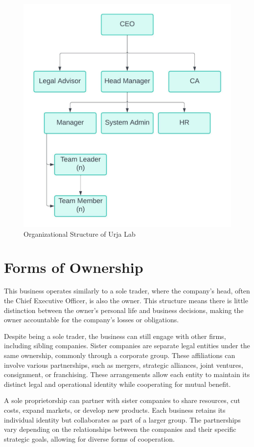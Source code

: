         \begin{figure}[H]
          
          \includegraphics[width=\textwidth]{./Graphics/orgchart.jpeg}
          \caption{Organizational Structure of Urja Lab}
          \label{fig:orgchart}
        \end{figure}
        

      \section{Forms of Ownership}
This business operates similarly to a sole trader, where the company's head, often the Chief Executive Officer, is also the owner. This structure means there is little distinction between the owner's personal life and business decisions, making the owner accountable for the company's losses or obligations.

Despite being a sole trader, the business can still engage with other firms, including sibling companies. Sister companies are separate legal entities under the same ownership, commonly through a corporate group. These affiliations can involve various partnerships, such as mergers, strategic alliances, joint ventures, consignment, or franchising. These arrangements allow each entity to maintain its distinct legal and operational identity while cooperating for mutual benefit.

A sole proprietorship can partner with sister companies to share resources, cut costs, expand markets, or develop new products. Each business retains its individual identity but collaborates as part of a larger group. The partnerships vary depending on the relationships between the companies and their specific strategic goals, allowing for diverse forms of cooperation.
